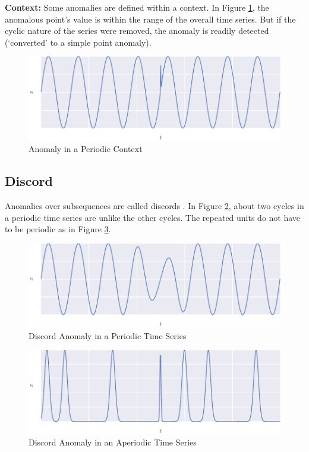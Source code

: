 \textbf{Context:} Some anomalies are defined within a context. In Figure \ref{fig:contextanom}, the anomalous point's value is within the range of the overall time series. But if the cyclic nature of the series were removed, the anomaly is readily detected (`converted' to a simple point anomaly).

\begin{figure}[H]
  \centering
  \includegraphics{figs/context.pdf}
  \caption{Anomaly in a Periodic Context}
  \label{fig:contextanom}
\end{figure}


\subsection{Discord}

Anomalies over subsequences are called discords \cite{Cheboli2010}. In Figure \ref{fig:perdiscordanom}, about two cycles in a periodic time series are unlike the other cycles. The repeated units do not have to be periodic as in Figure \ref{fig:aperdiscordanom}. 

\begin{figure}[H]
  \centering
  \includegraphics{figs/discord_per.pdf}
  \caption{Discord Anomaly in a Periodic Time Series}
  \label{fig:perdiscordanom}
\end{figure}

\begin{figure}[H]
  \centering
  \includegraphics{figs/discord_aper.pdf}
  \caption{Discord Anomaly in an Aperiodic Time Series}
  \label{fig:aperdiscordanom}
\end{figure}

